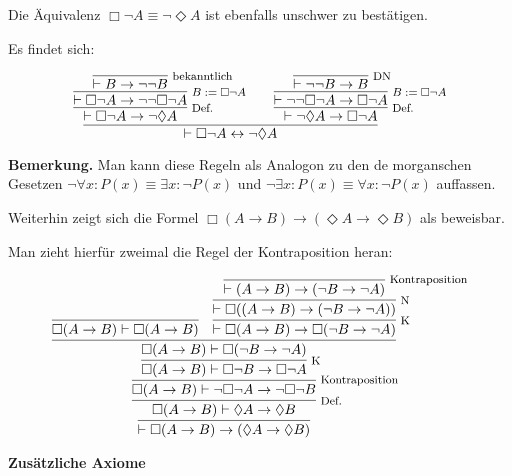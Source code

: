 \documentclass[8pt]{beamer}
\newcommand{\strong}[1]{\textsf{\textbf{#1}}}
\newcommand{\infernote}[1]{\!\text{\footnotesize #1}}
\newcommand{\centerheadline}[1]{%
  \begin{center}\strong{#1}\end{center}}
\newcommand{\parspace}{\vspace{0.8em}}
\newcommand{\cond}{\rightarrow}
\newcommand{\bicond}{\leftrightarrow}
\newcommand{\lnec}{\Box}
\newcommand{\lpos}{\Diamond}
\begin{document}
\begin{frame}
Die Äquivalenz $\lnec\neg A\equiv\neg\lpos A$
ist ebenfalls unschwer zu bestätigen.

\parspace
Es findet sich:\pause

\[
\infer{\vdash \lnec\neg A\bicond\neg\lpos A}{
  \infer[\infernote{Def.}]{\vdash\lnec\neg A\cond\neg\lpos A}{
    \infer[\infernote{$B:=\lnec\neg A$}\quad]{\vdash\lnec\neg A\cond\neg\neg\lnec\neg A}{
      \infer[\infernote{bekanntlich}]{\vdash B\cond\neg\neg B}{}}}
& \infer[\infernote{Def.}]{\vdash\neg\lpos A\cond\lnec\neg A}{
    \infer[\infernote{$B:=\lnec\neg A$}]{\vdash\neg\neg\lnec\neg A\cond\lnec\neg A}{
      \infer[\infernote{DN}]{\vdash\neg\neg B\cond B}{}}}}
\]\pause

\vspace{2em}
\begin{small}
\strong{Bemerkung.}
Man kann diese Regeln als Analogon zu den de morganschen Gesetzen
$\neg\forall x\colon P(x)\equiv\exists x\colon\neg P(x)$
und $\neg\exists x\colon P(x)\equiv\forall x\colon\neg P(x)$
auffassen.
\end{small}
\end{frame}

\begin{frame}
Weiterhin zeigt sich die Formel $\lnec (A\cond B)\cond (\lpos A\cond\lpos B)$
als beweisbar.

\parspace
Man zieht hierfür zweimal die Regel der Kontraposition heran:\pause

\vspace{1em}
\[
\infer{\vdash\lnec (A\cond B)\cond (\lpos A\cond\lpos B)}{
  \infer[\infernote{Def.}]{\lnec (A\cond B)\vdash\lpos A\cond\lpos B}{
    \infer[\infernote{Kontraposition}]{\lnec (A\cond B)\vdash\neg\lnec\neg A\cond\neg\lnec\neg B}{
      \infer[\infernote{K}]{\lnec (A\cond B)\vdash\lnec\neg B\cond\lnec\neg A}{
        \infer{\lnec (A\cond B)\vdash\lnec (\neg B\cond\neg A)}{
          \infer{\lnec (A\cond B)\vdash\lnec (A\cond B)}{}
        & \infer[\infernote{K}]{\vdash\lnec (A\cond B)\cond\lnec (\neg B\cond\neg A)}{
            \infer[\infernote{N}]{\vdash\lnec ((A\cond B)\cond(\neg B\cond\neg A))}{
              \infer[\infernote{Kontraposition}]{\vdash (A\cond B)\cond (\neg B\cond\neg A)}{}}}}}}}}
\]
\end{frame}

\begin{frame}
\centerheadline{Zusätzliche Axiome}
\end{frame}
\end{document}
